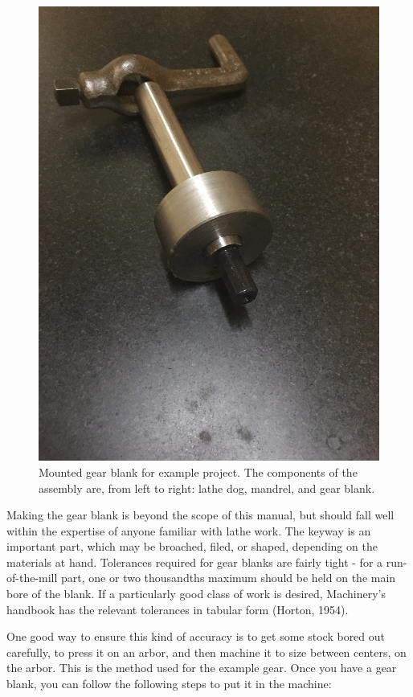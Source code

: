 \documentclass[12pt,twoside,letterpaper]{article}
\begin{document}
\begin{figure}[H]
\centering
\includegraphics[width=5in]{gearBlank}
	\caption{Mounted gear blank for example project. The components of the assembly are, from left to right: lathe dog, mandrel, and gear blank.}

\end{figure}
		Making the gear blank is beyond the scope of this manual, but should fall well within the expertise of anyone familiar with lathe work. The keyway is an important part, which may be broached, filed, or shaped, depending on the materials at hand. Tolerances required for gear blanks are fairly tight - for a run-of-the-mill part, one or two thousandths maximum should be held on the main bore of the blank. If a particularly good class of work is desired, Machinery's handbook has the relevant tolerances in tabular form (Horton, 1954).

		One good way to ensure this kind of accuracy is to get some stock bored out carefully, to press it on an arbor, and then machine it to size between centers, on the arbor. This is the method used for the example gear. Once you have a gear blank, you can follow the following steps to put it in the machine:
\end{document}
